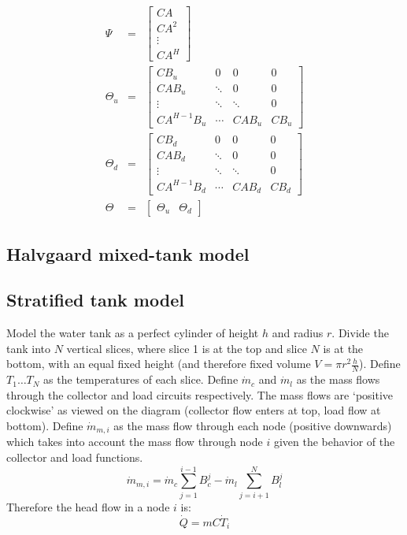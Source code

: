 \begin{eqnarray}
   \label{eq:mpc-psi}
   \Psi &=& \left[\begin{array}{c}
      CA \\ CA^2 \\ \vdots \\ CA^H
   \end{array}\right]
   \\\label{eq:mpc-theta-u}
   \Theta_u &=& \left[\begin{array}{cccc}
      CB_u & 0 & 0 & 0 \\
      CAB_u & \ddots & 0 & 0 \\
      \vdots & \ddots & \ddots & 0 \\
      CA^{H-1}B_u & \cdots & CAB_u & CB_u
   \end{array}\right]
   \\\label{eq:mpc-theta-d}
   \Theta_d &=& \left[\begin{array}{cccc}
      CB_d & 0 & 0 & 0 \\
      CAB_d & \ddots & 0 & 0 \\
      \vdots & \ddots & \ddots & 0 \\
      CA^{H-1}B_d & \cdots & CAB_d & CB_d
   \end{array}\right]
   \\\label{eq:mpc-theta}
   \Theta &=& \left[\begin{array}{cc}
      \Theta_u & \Theta_d
   \end{array}\right]
\end{eqnarray}

\subsection{Halvgaard mixed-tank model}
\label{sec:model:halvgaard}

\subsection{Stratified tank model}

Model the water tank as a perfect cylinder of height $h$ and radius $r$.
Divide the tank into $N$ vertical slices, where slice 1 is at the top and slice $N$ is at the bottom, with an equal fixed height (and therefore fixed volume $V = \pi r^2 \frac{h}{N}$).
Define $T_1 \dots T_N$ as the temperatures of each slice.
Define $\dot{m}_c$ and $\dot{m}_l$ as the mass flows through the collector and load circuits respectively.
The mass flows are `positive clockwise' as viewed on the diagram (collector flow enters at top, load flow at bottom).
Define $\dot{m}_{m, i}$ as the mass flow through each node (positive downwards) which takes into account the mass flow through node $i$ given the behavior of the collector and load functions.
$$ \dot{m}_{m, i} = \dot{m}_c \sum _{j=1} ^{i-1} B^j_c - \dot{m}_l \sum _{j=i+1} ^N B^j_l $$
Therefore the head flow in a node $i$ is:
$$ \dot{Q} = m C \dot{T}_i $$
